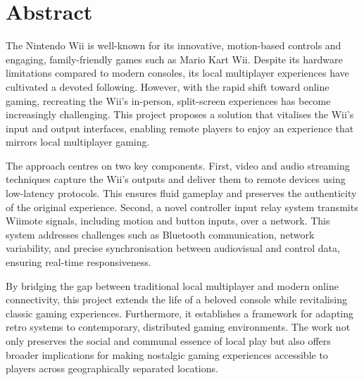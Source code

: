 \chapter*{Abstract}

The Nintendo Wii is well-known for its innovative, motion-based controls and engaging, family-friendly games such as Mario Kart Wii. Despite its hardware limitations compared to modern consoles, its local multiplayer experiences have cultivated a devoted following. However, with the rapid shift toward online gaming, recreating the Wii’s in-person, split-screen experiences has become increasingly challenging. This project proposes a solution that vitalises the Wii’s input and output interfaces, enabling remote players to enjoy an experience that mirrors local multiplayer gaming.

The approach centres on two key components. First, video and audio streaming techniques capture the Wii’s outputs and deliver them to remote devices using low-latency protocols. This ensures fluid gameplay and preserves the authenticity of the original experience. Second, a novel controller input relay system transmits Wiimote signals, including motion and button inputs, over a network. This system addresses challenges such as Bluetooth communication, network variability, and precise synchronisation between audiovisual and control data, ensuring real-time responsiveness.

By bridging the gap between traditional local multiplayer and modern online connectivity, this project extends the life of a beloved console while revitalising classic gaming experiences. Furthermore, it establishes a framework for adapting retro systems to contemporary, distributed gaming environments. The work not only preserves the social and communal essence of local play but also offers broader implications for making nostalgic gaming experiences accessible to players across geographically separated locations.
